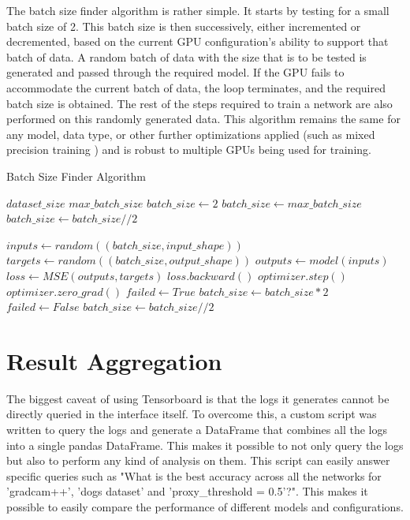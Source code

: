 The batch size finder algorithm is rather simple. It starts by testing for a small batch size of 2. This batch size is then successively, either incremented or decremented, based on the current GPU configuration's ability to support that batch of data. 
A random batch of data with the size that is to be tested is generated and passed through the required model. If the GPU fails to accommodate the current batch of data, the loop terminates, and the required batch size is obtained. The rest of the steps required to train a network are also performed on this randomly generated data.
This algorithm remains the same for any model, data type, or other further optimizations applied (such as mixed precision training \cite{micikeviciusMixedPrecisionTraining2017}) and is robust to multiple GPUs being used for training.
\begin{algorithm}
    \caption{Batch Size Finder Algorithm}
    \label{alg:batch_size_finder}
    \begin{algorithmic}
        \REQUIRE $dataset\_size$
        \REQUIRE $max\_batch\_size$
        \STATE $batch\_size \leftarrow 2$
        \STATE $batch\_size \leftarrow max\_batch\_size$
        \ENDIF
        \STATE $batch\_size \leftarrow batch\_size // 2$
        \ENDIF

        \LOOP
        \STATE $inputs \leftarrow random((batch\_size,input\_shape))$
        \STATE $targets \leftarrow random((batch\_size,output\_shape))$
        \STATE $outputs \leftarrow model(inputs)$
        \STATE $loss \leftarrow MSE(outputs, targets)$
        \STATE $loss.backward()$
        \STATE $optimizer.step()$
        \STATE $optimizer.zero\_grad()$
        \STATE $failed \leftarrow True$
        \STATE $batch\_size \leftarrow batch\_size * 2$
        \ENDLOOP
        \STATE $failed \leftarrow False$
        \STATE $batch\_size \leftarrow batch\_size // 2$
        \ENDIF
        \ENDWHILE

    \end{algorithmic}
\end{algorithm}

\section{Result Aggregation} \label{sec:result_aggregation}
The biggest caveat of using Tensorboard is that the logs it generates cannot be directly queried in the interface itself. To overcome this, a custom script was written to query the logs and generate a DataFrame that combines all the logs into a single pandas DataFrame. This makes it possible to not only query the logs but also to perform any kind of analysis on them. This script can easily answer specific queries such as "What is the best accuracy across all the networks for 'gradcam++', 'dogs dataset' and 'proxy\_threshold = 0.5'?". This makes it possible to easily compare the performance of different models and configurations. 

